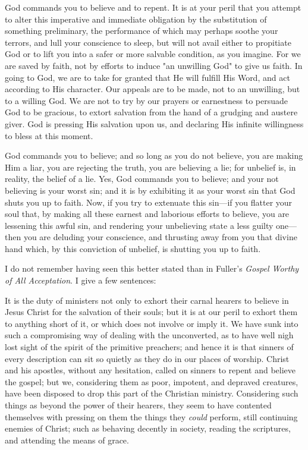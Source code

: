 \documentclass[
]{book}
\begin{document}
God commands you to believe and to repent. It is at your peril that you attempt to alter this imperative and immediate obligation by the substitution of something preliminary, the performance of which may perhaps soothe your terrors, and lull your conscience to sleep, but will not avail either to propitiate God or to lift you into a safer or more salvable condition, as you imagine. For we are saved by faith, not by efforts to induce "an unwilling God" to give us faith. In going to God, we are to take for granted that He will fulfill His Word, and act according to His character. Our appeals are to be made, not to an unwilling, but to a willing God. We are not to try by our prayers or earnestness to persuade God to be gracious, to extort salvation from the hand of a grudging and austere giver. God is pressing His salvation upon us, and declaring His infinite willingness to bless at this moment.

God commands you to believe; and so long as you do not believe, you are making Him a liar, you are rejecting the truth, you are believing a lie; for unbelief is, in reality, the belief of a lie. Yes, God commands you to believe; and your not believing is your worst sin; and it is by exhibiting it as your worst sin that God shuts you up to faith. Now, if you try to extenuate this sin---if you flatter your soul that, by making all these earnest and laborious efforts to believe, you are lessening this awful sin, and rendering your unbelieving state a less guilty one---then you are deluding your conscience, and thrusting away from you that divine hand which, by this conviction of unbelief, is shutting you up to faith.

I do not remember having seen this better stated than in Fuller's \emph{Gospel Worthy of All Acceptation}. I give a few sentences:

It is the duty of ministers not only to exhort their carnal hearers to believe in Jesus Christ for the salvation of their souls; but it is at our peril to exhort them to anything short of it, or which does not involve or imply it. We have sunk into such a compromising way of dealing with the unconverted, as to have well nigh lost sight of the spirit of the primitive preachers; and hence it is that sinners of every description can sit so quietly as they do in our places of worship. Christ and his apostles, without any hesitation, called on sinners to repent and believe the gospel; but we, considering them as poor, impotent, and depraved creatures, have been disposed to drop this part of the Christian ministry. Considering such things as beyond the power of their hearers, they seem to have contented themselves with pressing on them the things they \emph{could} perform, still continuing enemies of Christ; such as behaving decently in society, reading the scriptures, and attending the means of grace.
\end{document}
